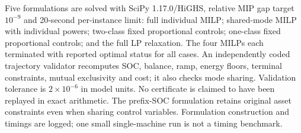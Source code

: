 \documentclass[11pt,letterpaper]{article}
\begin{document}
Five formulations are solved with SciPy 1.17.0/HiGHS, relative MIP gap target $10^{-9}$ and 20-second per-instance limit: full individual MILP; shared-mode MILP with individual powers; two-class fixed proportional controls; one-class fixed proportional controls; and the full LP relaxation. The four MILPs each terminated with reported optimal status for all cases. An independently coded trajectory validator recomputes SOC, balance, ramp, energy floors, terminal constraints, mutual exclusivity and cost; it also checks mode sharing. Validation tolerance is $2\times10^{-6}$ in model units. No certificate is claimed to have been replayed in exact arithmetic. The prefix-SOC formulation retains original asset constraints even when sharing control variables. Formulation construction and timings are logged; one small single-machine run is not a timing benchmark.
\end{document}
